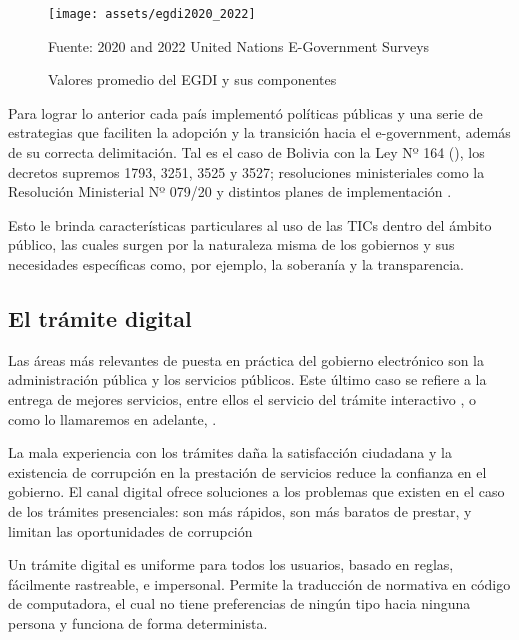 \begin{figure}[!htpb]
    \centering
    \texttt{[image: assets/egdi2020\_2022]}
    \caption{Valores promedio del EGDI y sus componentes}{Fuente: 2020 and 2022
        United Nations E-Government Surveys}
    \label{fig:egdi2020_2022}
\end{figure}

Para lograr lo anterior cada país implementó políticas públicas y una serie de estrategias que faciliten la adopción y la transición hacia el e-government, además de su correcta delimitación.
Tal es el caso de Bolivia con la Ley Nº 164 (\cite{Ley164Ley2011}), 
los decretos supremos 1793, 3251, 3525 y 3527; resoluciones ministeriales como la Resolución Ministerial Nº 079/20 y distintos planes de implementación \cite{DecretoSupremo17932013}\cite{DecretoSupremoNo2017}\cite{DECRETOSUPREMO35252018}\cite{DecretoSupremoNo2018}\cite{ResolucionMinisterialNo2020}\cite{PLANIMPLEMENTACIONSOFTWARE}.

Esto le brinda características particulares al uso de las TICs dentro del ámbito público, 
las cuales surgen por la naturaleza misma de los gobiernos y sus necesidades específicas como, por ejemplo, la soberanía y la transparencia.

\subsection{El trámite digital}

Las áreas más relevantes de puesta en práctica del gobierno electrónico son la administración pública y los servicios públicos. 
Este último caso se refiere a la entrega de mejores servicios, entre ellos el servicio del trámite interactivo \cite{naserGobiernoElectronicoGestion2011}, o como lo llamaremos en adelante, .

La mala experiencia con los trámites daña la satisfacción ciudadana y la existencia de corrupción en la prestación de servicios reduce la confianza en el gobierno\cite[71]{rosethFinTramiteEterno2018}.
El canal digital ofrece soluciones a los problemas que existen en el caso de los trámites presenciales: son más rápidos, son más baratos de prestar, y limitan las oportunidades de corrupción \cite[99]{rosethFinTramiteEterno2018}

Un trámite digital es uniforme para todos los usuarios, basado en reglas, fácilmente rastreable, e impersonal\cite[105]{rosethFinTramiteEterno2018}. 
Permite la traducción de normativa en código de computadora, el cual no tiene preferencias de ningún tipo hacia ninguna persona y funciona de forma determinista.

